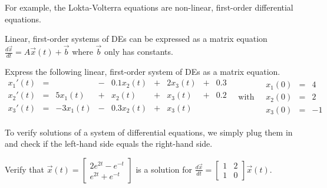\documentclass[../main.tex]{subfiles}
\begin{document}
For example, the Lokta-Volterra equations are non-linear, first-order differential equations.
\clearpage

Linear, first-order systems of DEs can be expressed as a matrix equation \(\frac{d \vec{x}}{dt} = A \vec{x}(t) + \vec{b}\) where \(\vec{b}\) only has constants.

\begin{example}
  Express the following linear, first-order system of DEs as a matrix equation.
  \[
     \begin{array}{rcrcrcrcr}
       x_{1}'(t) &=&              &-& 0.1 x_{2}(t) &+& 2 x_{3}(t) &+& 0.3\\
       x_{2}'(t) &=&   5 x_{1}(t) &+&     x_{2}(t) &+&   x_{3}(t) &+& 0.2 \\
       x_{3}'(t) &=&  -3 x_{1}(t) &-& 0.3 x_{2}(t) &+&   x_{3}(t) \\
     \end{array}
     \quad\text{with}\quad
     \begin{array}{rcr}
      x_{1}(0) &=& 4 \\
      x_{2}(0) &=& 2 \\
      x_{3}(0) &=& -1
     \end{array}
  \]

\end{example}

To verify solutions of a system of differential equations, we simply plug them in and check if the left-hand side equals the right-hand side.
\begin{example}
  Verify that \(\vec{x}(t) = \begin{bmatrix} 2 e^{2t} - e^{-t} \\ e^{2t} + e^{-t} \end{bmatrix}\) is a solution for \(\frac{d\vec{x}}{dt} = \begin{bmatrix} 1 & 2 \\ 1 & 0 \end{bmatrix} \vec{x}(t)\).
\end{example}

\end{document}
